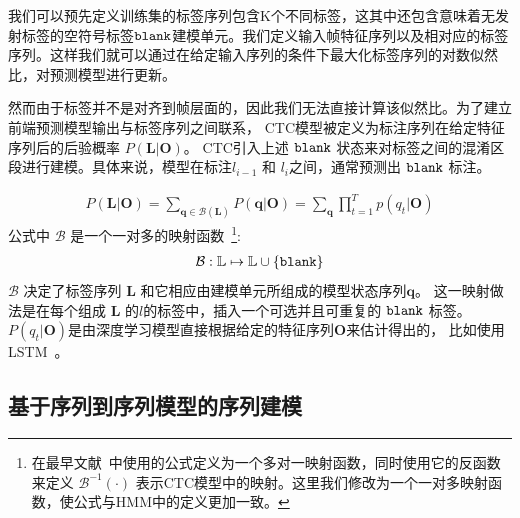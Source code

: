 我们可以预先定义训练集的标签序列包含K个不同标签，这其中还包含意味着无发射标签的空符号标签$\tt blank$建模单元。我们定义输入帧特征序列以及相对应的标签序列。这样我们就可以通过在给定输入序列的条件下最大化标签序列的对数似然比，对预测模型进行更新。

然而由于标签并不是对齐到帧层面的，因此我们无法直接计算该似然比。为了建立前端预测模型输出与标签序列之间联系，
CTC模型被定义为标注序列在给定特征序列后的后验概率 $P(\mathbf{L}|\mathbf{O})$。
CTC引入上述 $\tt blank$ 状态来对标签之间的混淆区段进行建模。具体来说，模型在标注$l_{i-1}$ 和 $l_{i}$之间，通常预测出 $ \tt blank$ 标注。

\begin{equation}
\label{equ:ctc-model}
\begin{split}
P(\mathbf{L}|\mathbf{O})=\sum_{\mathbf{q}\in\mathcal{B}(\mathbf{L})}P(\mathbf{q}|\mathbf{O}) =\sum_{\mathbf{q}}\prod_{t=1}^{T} p(q_t|\mathbf{O})
\end{split}
\end{equation}
公式中 $\mathcal{B}$ 是一个一对多的映射函数~\footnote{在最早文献~\cite{graves2006connectionist}中使用的公式定义为一个多对一映射函数，同时使用它的反函数来定义 $\mathcal{B}^{-1}(\cdot)$ 表示CTC模型中的映射。这里我们修改为一个一对多映射函数，使公式与HMM中的定义更加一致。}:
\begin{equation}
\label{equ:ctc-b}
\begin{split}
\mathcal{B}:\mathbb{L}   \mapsto  \mathbb{L} \cup \{\tt blank\}
\end{split}
\end{equation}
$\mathcal{B}$ 决定了标签序列 $\mathbf{L}$ 和它相应由建模单元所组成的模型状态序列$\mathbf{q}$。 这一映射做法是在每个组成 $\mathbf{L}$ 的$l$的标签中，插入一个可选并且可重复的 $ \tt blank$ 标签。 $P(q_t|\mathbf{O})$是由深度学习模型直接根据给定的特征序列$\mathbf{O}$来估计得出的， 比如使用LSTM~\cite{hochreiter1997long}。 

\subsection{基于序列到序列模型的序列建模}
\label{chap:intro2-e2e-s2s}

